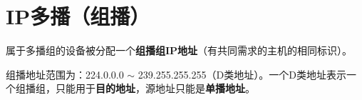 \section{IP多播（组播）}
属于多播组的设备被分配一个\textbf{组播组IP地址}（有共同需求的主机的相同标识）。

组播地址范围为：224.0.0.0 \(\sim\) 239.255.255.255（D类地址）。一个D类地址表示一个组播组，只能用于\textbf{目的地址}，源地址只能是\textbf{单播地址}。








































































